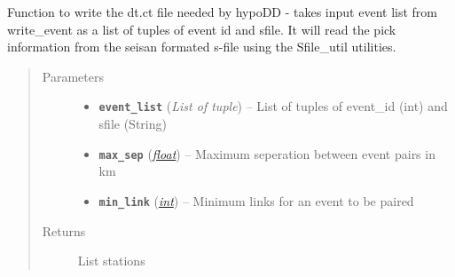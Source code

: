 \documentclass[a4paper,10pt,english]{sphinxmanual}
\begin{document}

\begin{fulllineitems}
\label{submodules/utils.catalogue2DD:catalogue2DD.write_catalogue}
Function to write the dt.ct file needed by hypoDD - takes input event list
from write\_event as a list of tuples of event id and sfile.  It will read
the pick information from the seisan formated s-file using the Sfile\_util
utilities.
\begin{quote}\begin{description}
\item[{Parameters}] \leavevmode\begin{itemize}
\item {} 
\textbf{\texttt{event\_list}} (\emph{List of tuple}) -- List of tuples of event\_id (int) and sfile (String)

\item {} 
\textbf{\texttt{max\_sep}} (\href{https://docs.python.org/library/functions.html\#float}{\emph{float}}) -- Maximum seperation between event pairs in km

\item {} 
\textbf{\texttt{min\_link}} (\href{https://docs.python.org/library/functions.html\#int}{\emph{int}}) -- Minimum links for an event to be paired

\end{itemize}

\item[{Returns}] \leavevmode
List stations

\end{description}\end{quote}

\end{fulllineitems}

\end{document}
